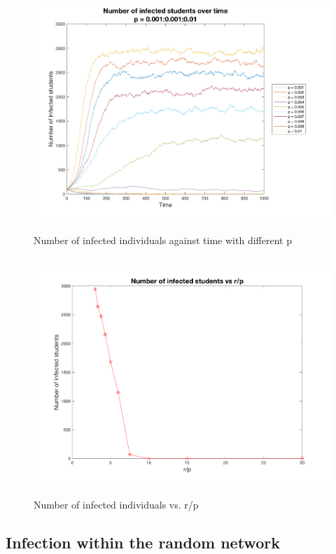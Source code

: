 \documentclass[12pt]{article}
\begin{document}
\begin{figure}[H] %
\centering
\includegraphics[width = 12 cm, height = 9cm]{infectp10r.png}
\caption{Number of infected individuals against time with different p}
\label{fig:infectp10r}
\end{figure}

\begin{figure}[H] %
\centering
\includegraphics[width = 12 cm, height = 9cm]{infectprp.png}
\caption{Number of infected individuals vs. r/p}
\label{fig:infectprp}
\end{figure}



\newpage
\subsection{Infection within the random network}
\end{document}

